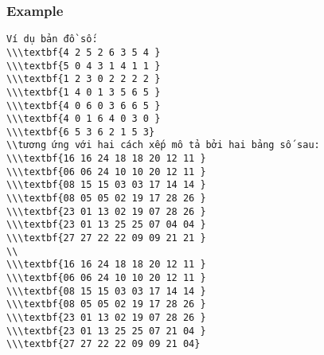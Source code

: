 \subsubsection{   Example  }
\begin{verbatim}
Ví dụ bản đồ số:
\\\textbf{4 2 5 2 6 3 5 4 }
\\\textbf{5 0 4 3 1 4 1 1 }
\\\textbf{1 2 3 0 2 2 2 2 }
\\\textbf{1 4 0 1 3 5 6 5 }
\\\textbf{4 0 6 0 3 6 6 5 }
\\\textbf{4 0 1 6 4 0 3 0 }
\\\textbf{6 5 3 6 2 1 5 3} 
\\tương ứng với hai cách xếp mô tả bởi hai bảng số sau:
\\\textbf{16 16 24 18 18 20 12 11 }
\\\textbf{06 06 24 10 10 20 12 11 }
\\\textbf{08 15 15 03 03 17 14 14 }
\\\textbf{08 05 05 02 19 17 28 26 }
\\\textbf{23 01 13 02 19 07 28 26 }
\\\textbf{23 01 13 25 25 07 04 04 }
\\\textbf{27 27 22 22 09 09 21 21 }
\\
\\\textbf{16 16 24 18 18 20 12 11 }
\\\textbf{06 06 24 10 10 20 12 11 }
\\\textbf{08 15 15 03 03 17 14 14 }
\\\textbf{08 05 05 02 19 17 28 26 }
\\\textbf{23 01 13 02 19 07 28 26 }
\\\textbf{23 01 13 25 25 07 21 04 }
\\\textbf{27 27 22 22 09 09 21 04}\end{verbatim}